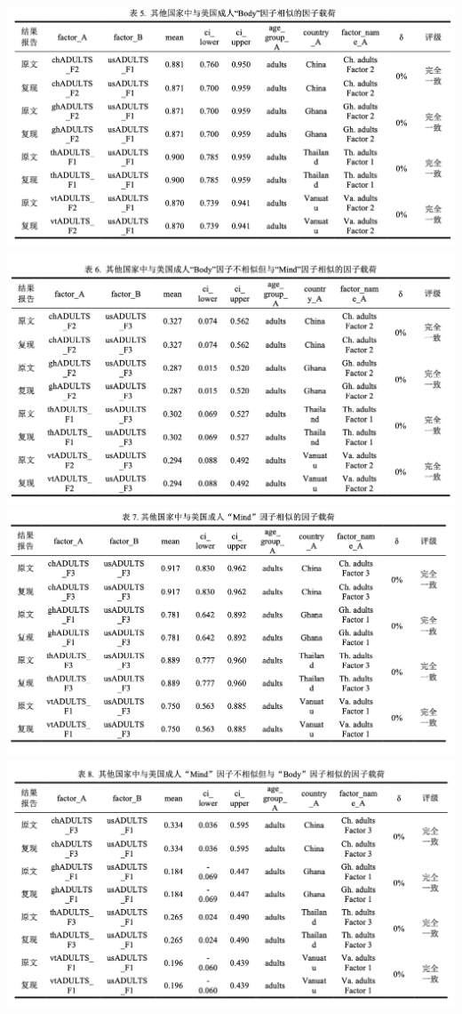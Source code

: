 \documentclass[
  man]{apa6}
\begin{document}
\includegraphics{./Script_Re_Weisman_2021_Group1_2024_files/Repeatability_figures/table5.png}
\includegraphics{./Script_Re_Weisman_2021_Group1_2024_files/Repeatability_figures/table6.png}
\includegraphics{./Script_Re_Weisman_2021_Group1_2024_files/Repeatability_figures/table7.png}
\includegraphics{./Script_Re_Weisman_2021_Group1_2024_files/Repeatability_figures/table8.png}
\end{document}
